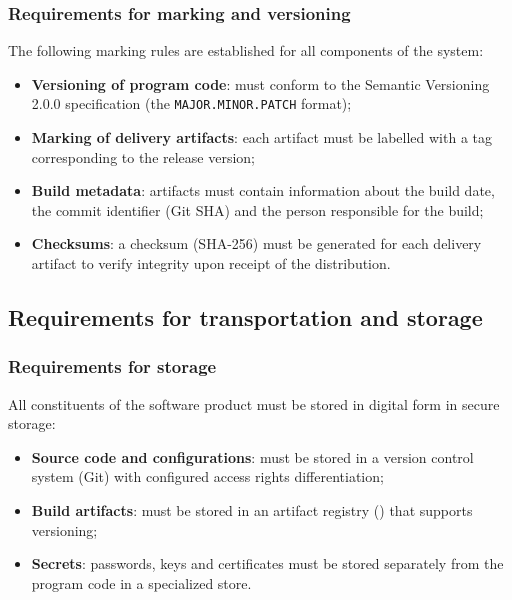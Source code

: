 \documentclass[12pt,a4paper]{extarticle}
\begin{document}
\subsubsection{Requirements for marking and versioning}

\begin{hseExample}
The following marking rules are established for all components of the system:
\begin{itemize}[nosep, leftmargin=1.25cm]
    \item \textbf{Versioning of program code}: must conform to the Semantic Versioning 2.0.0 specification (the \texttt{MAJOR.MINOR.PATCH} format);
    \item \textbf{Marking of delivery artifacts}: each artifact must be labelled with a tag corresponding to the release version;
    \item \textbf{Build metadata}: artifacts must contain information about the build date, the commit identifier (Git SHA) and the person responsible for the build;
    \item \textbf{Checksums}: a checksum (SHA-256) must be generated for each delivery artifact to verify integrity upon receipt of the distribution.
\end{itemize}
\end{hseExample}

\subsection{Requirements for transportation and storage}

\subsubsection{Requirements for storage}

\begin{hseExample}
All constituents of the software product must be stored in digital form in secure storage:
\begin{itemize}[nosep, leftmargin=1.25cm]
    \item \textbf{Source code and configurations}: must be stored in a version control system (Git) with configured access rights differentiation;
    \item \textbf{Build artifacts}: must be stored in an artifact registry () that supports versioning;
    \item \textbf{Secrets}: passwords, keys and certificates must be stored separately from the program code in a specialized store.
\end{itemize}
\end{hseExample}
\end{document}
